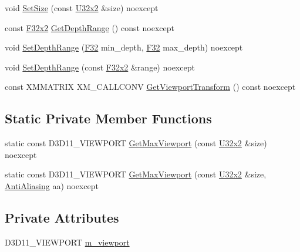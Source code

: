 \begin{DoxyCompactItemize}
\item 
void \mbox{\hyperlink{classmage_1_1rendering_1_1_viewport_a8b5578069d4e4afa99ca4a0b89541025}{Set\+Size}} (const \mbox{\hyperlink{namespacemage_ae5e7ccf8a1785baaacf57b3a0f4324e2}{U32x2}} \&size) noexcept
\item 
const \mbox{\hyperlink{namespacemage_aee4759dedc8def6c6dec26b5c7eddf29}{F32x2}} \mbox{\hyperlink{classmage_1_1rendering_1_1_viewport_a50cb4c020709eddb8addb4420a59e1d0}{Get\+Depth\+Range}} () const noexcept
\item 
void \mbox{\hyperlink{classmage_1_1rendering_1_1_viewport_a2dc258c833d225567bba28129c061c2d}{Set\+Depth\+Range}} (\mbox{\hyperlink{namespacemage_aa97e833b45f06d60a0a9c4fc22ae02c0}{F32}} min\+\_\+depth, \mbox{\hyperlink{namespacemage_aa97e833b45f06d60a0a9c4fc22ae02c0}{F32}} max\+\_\+depth) noexcept
\item 
void \mbox{\hyperlink{classmage_1_1rendering_1_1_viewport_a99c76e086ab0db6e9311ab4985d760d6}{Set\+Depth\+Range}} (const \mbox{\hyperlink{namespacemage_aee4759dedc8def6c6dec26b5c7eddf29}{F32x2}} \&range) noexcept
\item 
const X\+M\+M\+A\+T\+R\+IX X\+M\+\_\+\+C\+A\+L\+L\+C\+O\+NV \mbox{\hyperlink{classmage_1_1rendering_1_1_viewport_ac4ea113f2c019b5b1d369898537ab5c3}{Get\+Viewport\+Transform}} () const noexcept
\end{DoxyCompactItemize}
\subsection*{Static Private Member Functions}
\begin{DoxyCompactItemize}
\item 
static const D3\+D11\+\_\+\+V\+I\+E\+W\+P\+O\+RT \mbox{\hyperlink{classmage_1_1rendering_1_1_viewport_a9a931b51974ac4cd2d93aac2c0e10a09}{Get\+Max\+Viewport}} (const \mbox{\hyperlink{namespacemage_ae5e7ccf8a1785baaacf57b3a0f4324e2}{U32x2}} \&size) noexcept
\item 
static const D3\+D11\+\_\+\+V\+I\+E\+W\+P\+O\+RT \mbox{\hyperlink{classmage_1_1rendering_1_1_viewport_ac971d4f062cf37e3a5a2a57640a13da4}{Get\+Max\+Viewport}} (const \mbox{\hyperlink{namespacemage_ae5e7ccf8a1785baaacf57b3a0f4324e2}{U32x2}} \&size, \mbox{\hyperlink{namespacemage_1_1rendering_ac3f75e49e92b42f2f5fb55c450d8899c}{Anti\+Aliasing}} aa) noexcept
\end{DoxyCompactItemize}
\subsection*{Private Attributes}
\begin{DoxyCompactItemize}
\item 
D3\+D11\+\_\+\+V\+I\+E\+W\+P\+O\+RT \mbox{\hyperlink{classmage_1_1rendering_1_1_viewport_ab0b20f21a771248d9e9659f1029a497d}{m\+\_\+viewport}}
\end{DoxyCompactItemize}


